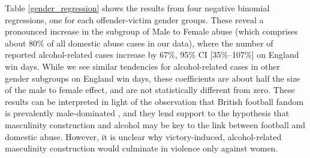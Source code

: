 \documentclass[12pt, letterpaper]{article}
\newcommand{\NS}[1] {{\textcolor{green}{#1}}}
\newcommand{\AT}[1] {{\textcolor{blue}{#1}}}
\begin{document}
Table \ref{gender_regression} shows the results from four negative binomial regressions, one for each offender-victim gender groups. These reveal a pronounced increase in the subgroup of Male to Female abuse (which comprises about 80\% of all domestic abuse cases in our data), where the number of reported alcohol-related cases increase by 67\%, 95\% CI [35\%--107\%] on England win days. While we see similar tendencies for alcohol-related cases in other gender subgroups on England win days, these coefficients are about half the size of the male to female effect, and are not statistically different from zero. These results can be interpreted in light of the observation that British football fandom is prevalently male-dominated \autocite{Parry2014}, and they lend support to the hypothesis that masculinity construction and alcohol may be key to the link between football and domestic abuse. However, it is unclear why victory-induced, alcohol-related masculinity construction would culminate in violence only against women. 
\end{document}
